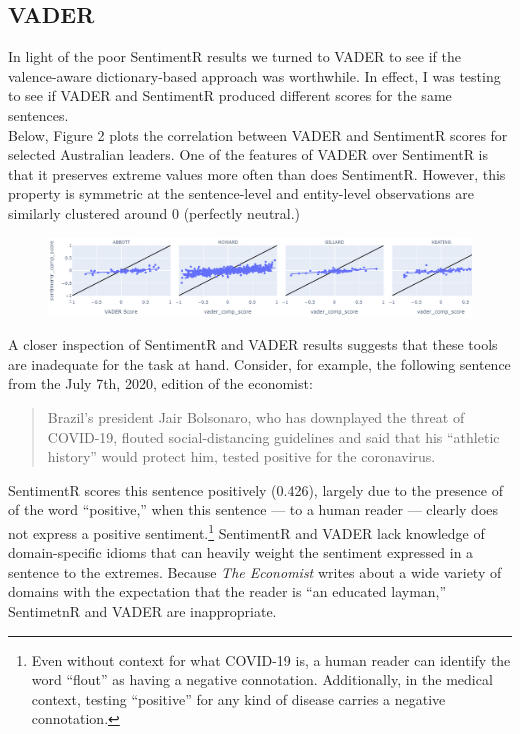 \documentclass[11pt, letterpaper, twoside]{article}
\begin{document}
    \subsection{VADER}
        In light of the poor SentimentR results we turned to VADER to see if the valence-aware dictionary-based approach was worthwhile. In effect, I was testing to see if VADER and SentimentR produced different scores for the same sentences.\\

        Below, Figure 2 plots the correlation between VADER and SentimentR scores for selected Australian leaders. One of the features of VADER over SentimentR is that it preserves extreme values more often than does SentimentR. However, this property is symmetric at the sentence-level and entity-level observations are similarly clustered around 0 (perfectly neutral.)\\

        \begin{figure}[t]
            \includegraphics[width=\textwidth]{figures/AUS_VADER_SentimentR_Corels.png}
        \end{figure}

        A closer inspection of SentimentR and VADER results suggests that these tools are inadequate for the task at hand. Consider, for example, the following sentence from the July 7th, 2020, edition of the economist:
        \begin{quote}
            \singlespacing
            Brazil's president Jair Bolsonaro, who has downplayed the threat of COVID-19, flouted social-distancing guidelines and said that his ``athletic history'' would protect him, tested positive for the coronavirus.
        \end{quote} 
        
        SentimentR scores this sentence positively (0.426), largely due to the presence of of the word ``positive,'' when this sentence --- to a human reader --- clearly does not express a positive sentiment.\footnote{Even without context for what COVID-19 is, a human reader can identify the word ``flout'' as having a negative connotation. Additionally, in the medical context, testing ``positive'' for any kind of disease carries a negative connotation.} SentimentR and VADER lack knowledge of domain-specific idioms that can heavily weight the sentiment expressed in a sentence to the extremes. Because \textit{The Economist} writes about a wide variety of domains with the expectation that the reader is ``an educated layman,'' SentimetnR and VADER are inappropriate.
\end{document}
